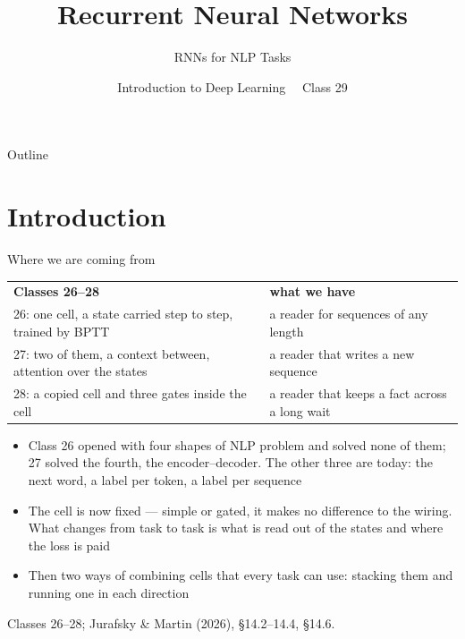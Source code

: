 \documentclass[aspectratio=169, 11pt]{beamer}
\title{Recurrent Neural Networks}
\subtitle{RNNs for NLP Tasks}
\author{Introduction to Deep Learning \ \textperiodcentered\ Class 29}
\institute{}
\date{}
\newcommand{\srcline}[1]{%
  \par\vspace{0.25em}%
  {\scriptsize\color{mcMuted}\hfill #1\par}}
\newcommand{\src}[3]{}      %
\newcommand{\nosrc}{}       %
\begin{document}
\maketitle

\begin{frame}{Outline}
  \nosrc
  \tableofcontents
\end{frame}

\section{Introduction}

\begin{frame}{Where we are coming from}
  \src{jurafsky_slp3}{section}{14.6}
  \src{jurafsky_slp3}{section}{14.4}
  \vspace{-0.3em}
  {\scriptsize
  \renewcommand{\arraystretch}{1.3}
  \begin{tabular}{@{}l@{\hspace{1.2em}}l@{}}
    \textbf{Classes 26--28} & \textbf{what we have}\\
    26: one cell, a state carried step to step, trained by BPTT & a reader for sequences of any length\\
    27: two of them, a context between, attention over the states & a reader that writes a new sequence\\
    28: a copied cell and three gates inside the cell & a reader that keeps a fact across a long wait\\
  \end{tabular}}
  \vspace{0.4em}

  {\footnotesize
  \begin{itemize}\itemsep0.2em
    \item Class 26 opened with four shapes of NLP problem and solved
          none of them; 27 solved the fourth, the encoder--decoder. The
          other three are today: the \alert{next word}, a \alert{label per
          token}, a \alert{label per sequence}
    \item The cell is now fixed --- simple or gated, it makes no
          difference to the wiring. What changes from task to task is
          \alert{what is read out} of the states and \alert{where the loss is paid}
    \item Then two ways of combining cells that every task can use:
          \alert{stacking} them and running one \alert{in each direction}
  \end{itemize}}
  \srcline{Classes 26--28; Jurafsky \& Martin (2026), \S14.2--14.4, \S14.6.}
\end{frame}
\end{document}
